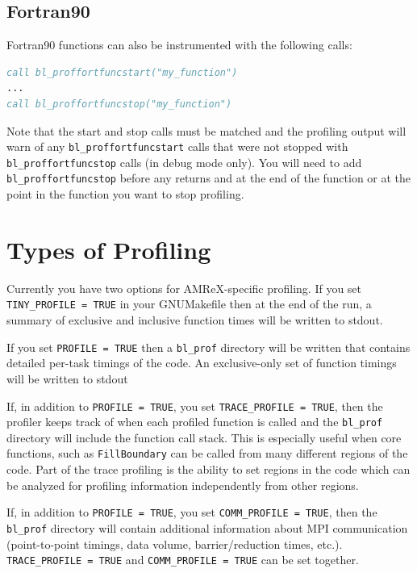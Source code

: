 \subsection{Fortran90} 

Fortran90 functions can also be instrumented with the following calls:
 
\begin{lstlisting}[language=fortran]
call bl_proffortfuncstart("my_function")
...
call bl_proffortfuncstop("my_function")
\end{lstlisting}
 
Note that the start and stop calls must be matched and the profiling output will warn of any 
{\tt bl\_proffortfuncstart} calls that were not stopped with {\tt bl\_proffortfuncstop} calls
(in debug mode only).  You will need to add {\tt bl\_proffortfuncstop}
before any returns and at the end of the function or at the point in the
function you want to stop profiling. 

\section{Types of Profiling} 

Currently you have two options for AMReX-specific profiling.  If you set {\tt TINY\_PROFILE = TRUE}
in your GNUMakefile then at the end of the run, a summary of exclusive and inclusive function times 
will be written to stdout.

If you set {\tt PROFILE = TRUE} then a {\tt bl\_prof} directory will be written that contains 
detailed per-task timings of the code.    An exclusive-only set of function timings will be written to stdout

If, in addition to  {\tt PROFILE = TRUE}, you set {\tt TRACE\_PROFILE = TRUE}, then the profiler keeps track
of when each profiled function is called and  the {\tt bl\_prof} directory will include the function call stack.   
This is especially useful when core functions, such as {\tt FillBoundary} can be called from many different regions of the code.
Part of the trace profiling is the ability to set regions in the code which can be analyzed for profiling information independently from other regions. 

If, in addition to  {\tt PROFILE = TRUE}, you set {\tt COMM\_PROFILE = TRUE}, then the {\tt bl\_prof} directory 
will contain additional information about MPI communication (point-to-point timings, data volume, barrier/reduction times, etc.).  {\tt TRACE\_PROFILE = TRUE} and {\tt COMM\_PROFILE = TRUE} can be set together.

